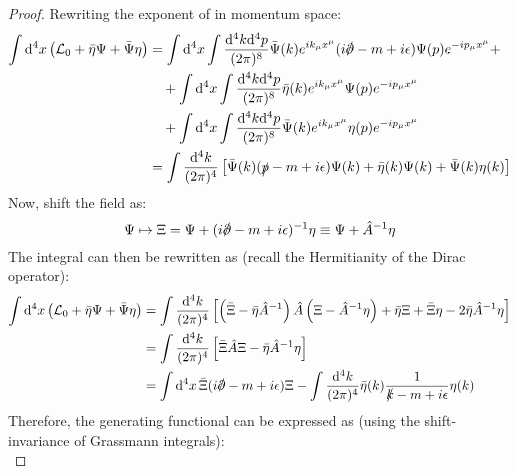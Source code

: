 \begin{proofbox}
  \begin{proof}
    Rewriting the exponent of  in momentum space:
    \begin{equation*}
      \begin{split}
        \int \dd^4x \left( \lag_0 + \bar{\eta} \Psi + \bar{\Psi} \eta \right)
        & = \int \dd^4x \int \frac{\dd^4k \dd^4p}{(2\pi)^8} \bar{\Psi}(k) e^{i k_\mu x^\mu} ( i \slashed{\pa} - m + i\epsilon ) \Psi(p) e^{-i p_\mu x^\mu} + \\
        & \quad + \int \dd^4x \int \frac{\dd^4k \dd^4p}{(2\pi)^8} \bar{\eta}(k) e^{i k_\mu x^\mu} \Psi(p) e^{-i p_\mu x^\mu} \\
        & \quad + \int \dd^4x \int \frac{\dd^4k \dd^4p}{(2\pi)^8} \bar{\Psi}(k) e^{i k_\mu x^\mu} \eta(p) e^{-i p_\mu x^\mu} \\
        & = \int \frac{\dd^4k}{(2\pi)^4} \left[ \bar{\Psi}(k) ( \slashed{p} - m + i\epsilon ) \Psi(k) + \bar{\eta}(k) \Psi(k) + \bar{\Psi}(k) \eta(k) \right]
      \end{split}
    \end{equation*}
    Now, shift the field as:
    \begin{equation*}
      \Psi \mapsto \Xi = \Psi + (i \slashed{\pa} - m + i\epsilon)^{-1} \eta \equiv \Psi + \hat{A}^{-1} \eta
    \end{equation*}
    The integral can then be rewritten as (recall the Hermitianity of the Dirac operator):
    \begin{equation*}
      \begin{split}
        \int \dd^4x \left( \lag_0 + \bar{\eta} \Psi + \bar{\Psi} \eta \right)
        & = \int \frac{\dd^4k}{(2\pi)^4} \left[ \left( \bar{\Xi} - \bar{\eta} \hat{A}^{-1} \right) \hat{A} \left( \Xi - \hat{A}^{-1} \eta \right) + \bar{\eta} \Xi + \bar{\Xi} \eta - 2 \bar{\eta} \hat{A}^{-1} \eta \right] \\
        & = \int \frac{\dd^4k}{(2\pi)^4} \left[ \bar{\Xi} \hat{A} \Xi - \bar{\eta} \hat{A}^{-1} \eta \right] \\
        & = \int \dd^4x\, \bar{\Xi} (i \slashed{\pa} - m + i\epsilon) \Xi - \int \frac{\dd^4k}{(2\pi)^4} \bar{\eta}(k) \frac{1}{\slashed{k} - m + i\epsilon} \eta(k)
      \end{split}
    \end{equation*}
    Therefore, the generating functional can be expressed as (using the shift-invariance of Grassmann integrals):
    \begin{equation*}

\end{equation*}
\end{proof}
\end{proofbox}
